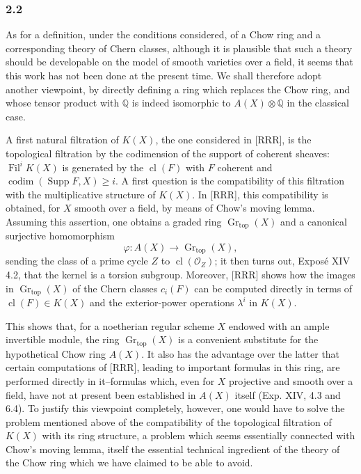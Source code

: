 \documentclass[11pt]{article}
\newcommand{\Gr}{\operatorname{Gr}}
\newcommand{\Fil}{\operatorname{Fil}}
\newcommand{\cl}{\operatorname{cl}}
\providecommand{\Gr}{\operatorname{Gr}}
\providecommand{\Gr}{\operatorname{G}}
\begin{document}
\subsubsection*{2.2}
As for a definition, under the conditions considered, of a Chow ring and a corresponding theory of Chern classes, although it is plausible that such a theory should be developable on the model of smooth varieties over a field, it seems that this work has not been done at the present time. We shall therefore adopt another viewpoint, by directly defining a ring which replaces the Chow ring, and whose tensor product with $\mathbb Q$ is indeed isomorphic to $A(X)\otimes\mathbb Q$ in the classical case.

A first natural filtration of $K(X)$, the one considered in [RRR], is the topological filtration by the codimension of the support of coherent sheaves: $\Fil^iK(X)$ is generated by the $\cl(F)$ with $F$ coherent and $\operatorname{codim}(\operatorname{Supp}F,X)\ge i$. A first question is the compatibility of this filtration with the multiplicative structure of $K(X)$. In [RRR], this compatibility is obtained, for $X$ smooth over a field, by means of Chow's moving lemma. Assuming this assertion, one obtains a graded ring $\Gr_{\mathrm{top}}(X)$ and a canonical surjective homomorphism
\[
\varphi:A(X)\longrightarrow \Gr_{\mathrm{top}}(X),
\]
sending the class of a prime cycle $Z$ to $\cl(\mathcal O_Z)$; it then turns out, Exposé XIV 4.2, that the kernel is a torsion subgroup. Moreover, [RRR] shows how the images in $\Gr_{\mathrm{top}}(X)$ of the Chern classes $c_i(F)$ can be computed directly in terms of $\cl(F)\in K(X)$ and the exterior-power operations $\lambda^i$ in $K(X)$.

This shows that, for a noetherian regular scheme $X$ endowed with an ample invertible module, the ring $\Gr_{\mathrm{top}}(X)$ is a convenient substitute for the hypothetical Chow ring $A(X)$. It also has the advantage over the latter that certain computations of [RRR], leading to important formulas in this ring, are performed directly in it--formulas which, even for $X$ projective and smooth over a field, have not at present been established in $A(X)$ itself (Exp. XIV, 4.3 and 6.4). To justify this viewpoint completely, however, one would have to solve the problem mentioned above of the compatibility of the topological filtration of $K(X)$ with its ring structure, a problem which seems essentially connected with Chow's moving lemma, itself the essential technical ingredient of the theory of the Chow ring which we have claimed to be able to avoid.
\end{document}
